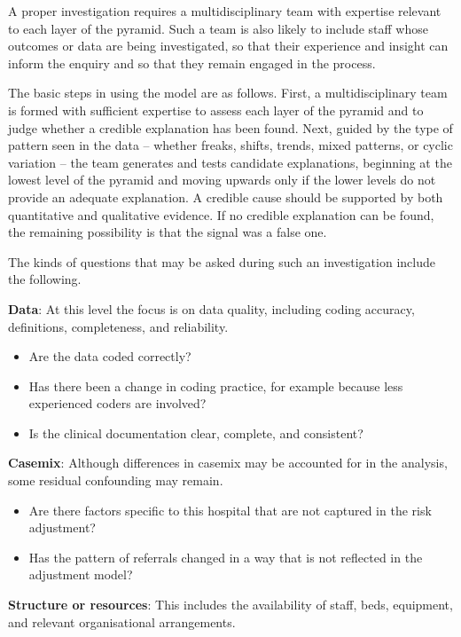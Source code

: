 \documentclass[
]{book}
\providecommand{\tightlist}{%
  \setlength{\itemsep}{0pt}\setlength{\parskip}{0pt}}
\begin{document}
A proper investigation requires a multidisciplinary team with expertise
relevant to each layer of the pyramid. Such a team is also likely to
include staff whose outcomes or data are being investigated, so that
their experience and insight can inform the enquiry and so that they
remain engaged in the process.

The basic steps in using the model are as follows. First, a
multidisciplinary team is formed with sufficient expertise to assess
each layer of the pyramid and to judge whether a credible explanation
has been found. Next, guided by the type of pattern seen in the data --
whether freaks, shifts, trends, mixed patterns, or cyclic variation --
the team generates and tests candidate explanations, beginning at the
lowest level of the pyramid and moving upwards only if the lower levels
do not provide an adequate explanation. A credible cause should be
supported by both quantitative and qualitative evidence. If no credible
explanation can be found, the remaining possibility is that the signal
was a false one.

The kinds of questions that may be asked during such an investigation
include the following.

\textbf{Data}: At this level the focus is on data quality, including
coding accuracy, definitions, completeness, and reliability.

\begin{itemize}
\tightlist
\item
  Are the data coded correctly?
\item
  Has there been a change in coding practice, for example because less
  experienced coders are involved?
\item
  Is the clinical documentation clear, complete, and consistent?
\end{itemize}

\textbf{Casemix}: Although differences in casemix may be accounted for
in the analysis, some residual confounding may remain.

\begin{itemize}
\tightlist
\item
  Are there factors specific to this hospital that are not captured in
  the risk adjustment?
\item
  Has the pattern of referrals changed in a way that is not reflected in
  the adjustment model?
\end{itemize}

\textbf{Structure or resources}: This includes the availability of
staff, beds, equipment, and relevant organisational arrangements.
\end{document}
